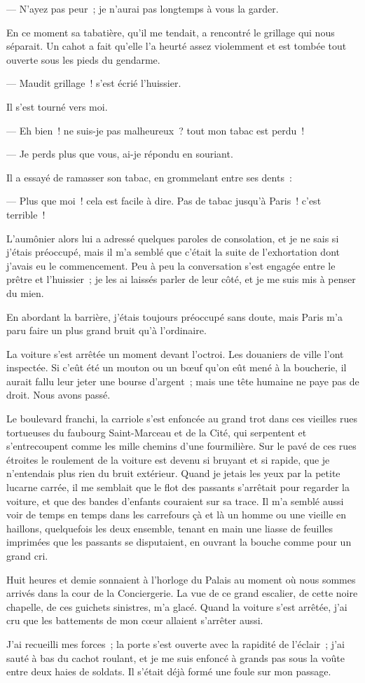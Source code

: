 \documentclass[french,twoside]{book} %
\begin{document}
— N’ayez pas peur ; je n’aurai pas longtemps à vous la garder.\par
En ce moment sa tabatière, qu’il me tendait, a rencontré le grillage qui nous séparait. Un cahot a fait qu’elle l’a heurté assez violemment et est tombée tout ouverte sous les pieds du gendarme.\par
 — Maudit grillage ! s’est écrié l’huissier.\par
Il s’est tourné vers moi.\par
— Eh bien ! ne suis-je pas malheureux ? tout mon tabac est perdu !\par
— Je perds plus que vous, ai-je répondu en souriant.\par
Il a essayé de ramasser son tabac, en grommelant entre ses dents :\par
— Plus que moi ! cela est facile à dire. Pas de tabac jusqu’à Paris ! c’est terrible !\par
L’aumônier alors lui a adressé quelques paroles de consolation, et je ne sais si j’étais préoccupé, mais il m’a semblé que c’était la suite de l’exhortation dont j’avais eu le commencement. Peu à peu la conversation s’est engagée entre le prêtre et l’huissier ; je les ai laissés parler de leur côté, et je me suis mis à penser du mien.\par
En abordant la barrière, j’étais toujours préoccupé sans doute, mais Paris m’a paru faire un plus grand bruit qu’à l’ordinaire.\par
La voiture s’est arrêtée un moment devant l’octroi. Les douaniers de ville l’ont inspectée. Si c’eût été un mouton ou un bœuf qu’on eût mené à la boucherie, il aurait fallu leur jeter une bourse d’argent ; mais une tête humaine ne paye pas de droit. Nous avons passé.\par
Le boulevard franchi, la carriole s’est enfoncée au grand trot dans ces vieilles rues tortueuses du faubourg Saint-Marceau et de la Cité, qui serpentent et s’entrecoupent comme les mille chemins d’une fourmilière. Sur le pavé de ces rues étroites le roulement de la voiture  est devenu si bruyant et si rapide, que je n’entendais plus rien du bruit extérieur. Quand je jetais les yeux par la petite lucarne carrée, il me semblait que le flot des passants s’arrêtait pour regarder la voiture, et que des bandes d’enfants couraient sur sa trace. Il m’a semblé aussi voir de temps en temps dans les carrefours çà et là un homme ou une vieille en haillons, quelquefois les deux ensemble, tenant en main une liasse de feuilles imprimées que les passants se disputaient, en ouvrant la bouche comme pour un grand cri.\par
Huit heures et demie sonnaient à l’horloge du Palais au moment où nous sommes arrivés dans la cour de la Conciergerie. La vue de ce grand escalier, de cette noire chapelle, de ces guichets sinistres, m’a glacé. Quand la voiture s’est arrêtée, j’ai cru que les battements de mon cœur allaient s’arrêter aussi.\par
J’ai recueilli mes forces ; la porte s’est ouverte avec la rapidité de l’éclair ; j’ai sauté à bas du cachot roulant, et je me suis enfoncé à grands pas sous la voûte entre deux haies de soldats. Il s’était déjà formé une foule sur mon passage.
\end{document}
